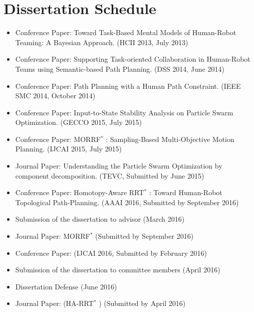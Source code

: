 \documentclass[phd]{byuprop}
\begin{document}
\section{Dissertation Schedule}

\begin{itemize}
\item Conference Paper: Toward Task-Based Mental Models of Human-Robot Teaming: A Bayesian Approach. (HCII 2013, July 2013)
\item Conference Paper: Supporting Task-oriented Collaboration in Human-Robot Teams using Semantic-based Path Planning. (DSS 2014, June 2014)
\item Conference Paper: Path Planning with a Human
Path Constraint. (IEEE SMC 2014, October 2014)
\item Conference Paper: Input-to-State Stability Analysis on Particle Swarm Optimization. (GECCO 2015, July 2015)
\item Conference Paper: MORRF$^{*}$ : Sampling-Based Multi-Objective Motion Planning. (IJCAI 2015, July 2015)
\item Journal Paper: Understanding the Particle Swarm Optimization by component decomposition. (TEVC, Submitted by June 2015)
\item Conference Paper: Homotopy-Aware RRT$^{*}$ : Toward Human-Robot Topological Path-Planning. (AAAI 2016, Submitted by September 2016)
\item Submission of the dissertation to advisor (March 2016)
\item Journal Paper: MORRF$^{*}$ (Submitted by September 2016)
\item Conference Paper: (IJCAI 2016, Submitted by February 2016)
\item Submission of the dissertation to committee members (April 2016)
\item Dissertation Defense (June 2016)
\item Journal Paper: (HA-RRT$^{*}$ ) (Submitted by April 2016)
\end{itemize}



\end{document}
